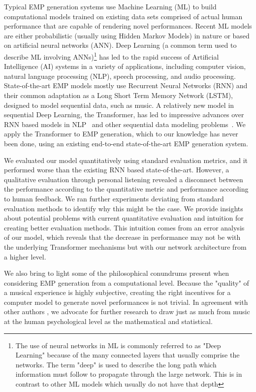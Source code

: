 Typical EMP generation systems use Machine Learning (ML) to build computational models trained on existing data sets comprised of actual human performance that are capable of rendering novel performances. Recent ML models are either probabilistic (usually using Hidden Markov Models) in nature or based on artificial neural networks (ANN). Deep Learning (a common term used to describe ML involving ANNs)\footnote{The use of neural networks in ML is commonly referred to as "Deep Learning" because of the many connected layers that usually comprise the networks. The term "deep" is used to describe the long path which information must follow to propagate through the large network. This is in contrast to other ML models which usually do not have that depth} has led to the rapid success of Artificial Intelligence (AI) systems in a variety of applications, including computer vision, natural language processing (NLP), speech processing, and audio processing\cite{goodfellow2016deep}. State-of-the-art EMP models mostly use Recurrent Neural Networks (RNN) and their common adaptation as a Long Short Term Memory Network (LSTM), designed to model sequential data, such as music. A relatively new model in sequential Deep Learning, the Transformer, has led to impressive advances over RNN based models in NLP~\cite{devlin2018bert,brown2020language} and other sequential data modeling problems~\cite{dosovitskiy2020image}. We apply the Transformer to EMP generation, which to our knowledge has never been done, using an existing end-to-end state-of-the-art EMP generation system. 

We evaluated our model quantitatively using standard evaluation metrics, and it performed worse than the existing RNN based state-of-the-art. However, a qualitative evaluation through personal listening revealed a disconnect between the performance according to the quantitative metric and performance according to human feedback. We ran further experiments deviating from standard evaluation methods to identify why this might be the case. We provide insights about potential problems with current quantitative evaluation and intuition for creating better evaluation methods. This intuition comes from an error analysis of our model, which reveals that the decrease in performance may not be with the underlying Transformer mechanisms but with our network architecture from a higher level. 

We also bring to light some of the philosophical conundrums present when considering EMP generation from a computational level. Because the "quality" of a musical experience is highly subjective, creating the right incentives for a computer model to generate novel performances is not trivial. In agreement with other authors \cite{widmer2016getting}, we advocate for further research to draw just as much from music at the human psychological level as the mathematical and statistical. 